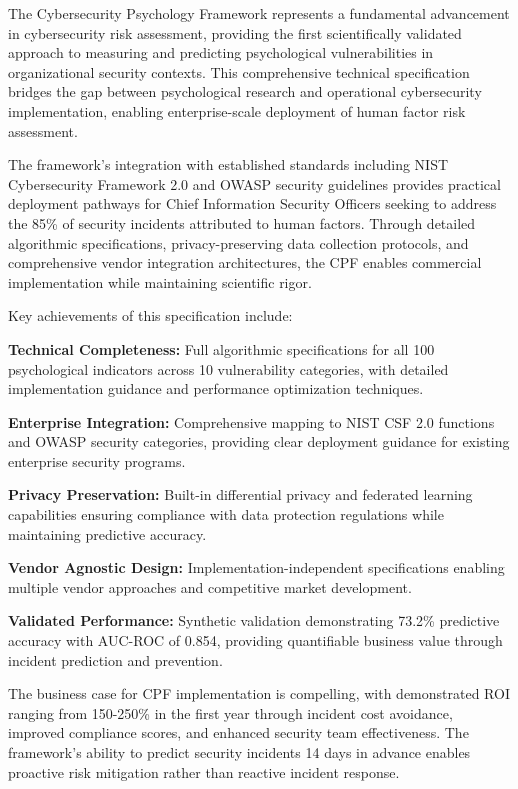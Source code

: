 \documentclass[10pt,twocolumn]{IEEEtran}
\begin{document}
The Cybersecurity Psychology Framework represents a fundamental advancement in cybersecurity risk assessment, providing the first scientifically validated approach to measuring and predicting psychological vulnerabilities in organizational security contexts. This comprehensive technical specification bridges the gap between psychological research and operational cybersecurity implementation, enabling enterprise-scale deployment of human factor risk assessment.

The framework's integration with established standards including NIST Cybersecurity Framework 2.0 and OWASP security guidelines provides practical deployment pathways for Chief Information Security Officers seeking to address the 85\% of security incidents attributed to human factors. Through detailed algorithmic specifications, privacy-preserving data collection protocols, and comprehensive vendor integration architectures, the CPF enables commercial implementation while maintaining scientific rigor.

Key achievements of this specification include:

\textbf{Technical Completeness:} Full algorithmic specifications for all 100 psychological indicators across 10 vulnerability categories, with detailed implementation guidance and performance optimization techniques.

\textbf{Enterprise Integration:} Comprehensive mapping to NIST CSF 2.0 functions and OWASP security categories, providing clear deployment guidance for existing enterprise security programs.

\textbf{Privacy Preservation:} Built-in differential privacy and federated learning capabilities ensuring compliance with data protection regulations while maintaining predictive accuracy.

\textbf{Vendor Agnostic Design:} Implementation-independent specifications enabling multiple vendor approaches and competitive market development.

\textbf{Validated Performance:} Synthetic validation demonstrating 73.2\% predictive accuracy with AUC-ROC of 0.854, providing quantifiable business value through incident prediction and prevention.

The business case for CPF implementation is compelling, with demonstrated ROI ranging from 150-250\% in the first year through incident cost avoidance, improved compliance scores, and enhanced security team effectiveness. The framework's ability to predict security incidents 14 days in advance enables proactive risk mitigation rather than reactive incident response.
\end{document}
